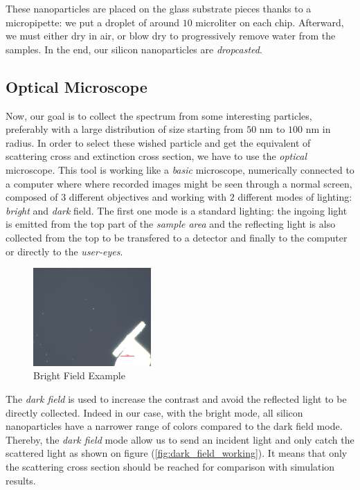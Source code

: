 \documentclass{article}
\numberwithin{equation}{section}
\begin{document}
These nanoparticles are placed on the glass substrate pieces thanks to a micropipette: we put a droplet of around $10$ microliter on each chip. Afterward, we must either dry in air, or blow dry to progressively remove water from the samples. In the end, our silicon nanoparticles are \textit{dropcasted}.

\subsection{Optical Microscope}

Now, our goal is to collect the spectrum from some interesting particles, preferably with a large distribution of size starting from $50$ nm to $100$ nm in radius. In order to select these wished particle and get the equivalent of scattering cross and extinction cross section, we have to use the \textit{optical} microscope. This tool is working like a \textit{basic} microscope, numerically connected to a computer where where recorded images might be seen through a normal screen, composed of $3$ different objectives and working with $2$ different modes of lighting: \textit{bright} and \textit{dark} field. The first one mode is a standard lighting: the ingoing light is emitted from the top part of the \textit{sample area} and the reflecting light is also collected from the top to be transfered to a detector and finally to the computer or directly to the \textit{user-eyes}.
\begin{figure}[h!]
    \centering
    \includegraphics[width=0.4\textwidth, height=0.35\textwidth]{bright_field_ex.png}
    \caption{Bright Field Example}
    \label{fig:bright_field_ex}
\end{figure}
The \textit{dark field} is used to increase the contrast and avoid the reflected light to be directly collected. Indeed in our case, with the bright mode, all silicon nanoparticles have a narrower range of colors compared to the dark field mode. Thereby, the \textit{dark field} mode allow us to send an incident light and only catch the scattered light as shown on figure (\ref{fig:dark_field_working}). It means that only the scattering cross section should be reached for comparison with simulation results.
\end{document}
